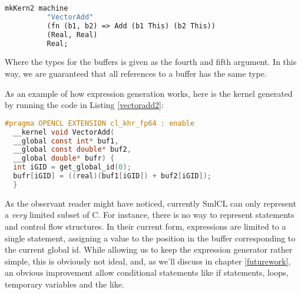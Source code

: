 \begin{lstlisting}[mathescape,language=ML,caption=Expressing VectorAdd
  using SmlCLs expression generating capabilities.,label=vectoradd2]
  mkKern2 machine
          "VectorAdd"
          (fn (b1, b2) => Add (b1 This) (b2 This))
          (Real, Real)
          Real;
\end{lstlisting}

Where the types for the buffers is given as the fourth and fifth
argument. In this way, we are guaranteed that all references to a buffer
has the same type.

As an example of how expression generation works, here is the kernel
generated by running the code in Listing \ref{vectoradd2}:

\begin{lstlisting}[mathescape,language=C,caption=VectorAdd as
    generated by SmlCL]
  #pragma OPENCL EXTENSION cl_khr_fp64 : enable
  __kernel void VectorAdd(
  __global const int* buf1,
  __global const double* buf2,
  __global double* bufr) {
  int iGID = get_global_id(0);
  bufr[iGID] = ((real)(buf1[iGID]) + buf2[iGID]);
  }
\end{lstlisting}

As the observant reader might have noticed, currently SmlCL can only
represent a \emph{very} limited subset of C. For instance, there is no
way to represent statements and control flow structures. In their
current form, expressions are limited to a single statement, assigning
a value to the position in the buffer corresponding to the current
global id. While allowing us to keep the expression generator rather
simple, this is obviously not ideal, and, as we'll discuss in chapter
\ref{futurework}, an obvious improvement allow conditional statements
like if statements, loops, temporary variables and the like.

